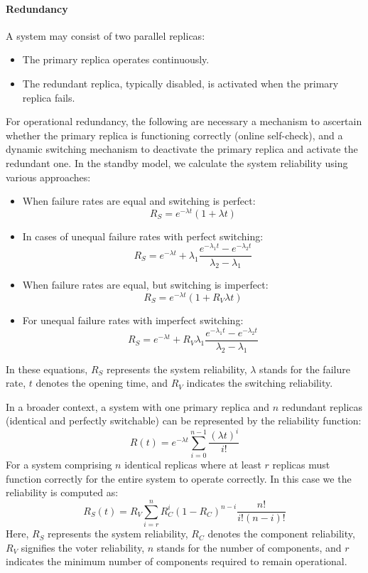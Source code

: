 \paragraph*{Redundancy}
A system may consist of two parallel replicas:
\begin{itemize}
    \item The primary replica operates continuously.
    \item The redundant replica, typically disabled, is activated when the primary replica fails.
\end{itemize}
For operational redundancy, the following are necessary a mechanism to ascertain whether the primary replica is functioning correctly (online self-check), and a dynamic switching mechanism to deactivate the primary replica and activate the redundant one.
In the standby model, we calculate the system reliability using various approaches:
\begin{itemize}
    \item When failure rates are equal and switching is perfect:
        \[R_S=e^{-\lambda t}(1+\lambda t)\]
    \item In cases of unequal failure rates with perfect switching:
        \[R_S=e^{-\lambda t}+\lambda_1 \dfrac{e^{-\lambda_1 t}-e^{-\lambda_2 t}}{\lambda_2-\lambda_1}\]
    \item When failure rates are equal, but switching is imperfect:
        \[R_S=e^{-\lambda t}(1+R_V\lambda t)\]
    \item For unequal failure rates with imperfect switching:
        \[R_S=e^{-\lambda t}+R_V\lambda_1 \dfrac{e^{-\lambda_1 t}-e^{-\lambda_2 t}}{\lambda_2-\lambda_1}\]
\end{itemize}
In these equations, $R_S$ represents the system reliability, $\lambda$ stands for the failure rate, $t$ denotes the opening time, and $R_V$ indicates the switching reliability.

In a broader context, a system with one primary replica and $n$ redundant replicas (identical and perfectly switchable) can be represented by the reliability function:
\[R(t)=e^{-\lambda t}\sum_{i=0}^{n-1}\dfrac{{\left(\lambda t\right)}^i}{i!}\]
For a system comprising $n$ identical replicas where at least $r$ replicas must function correctly for the entire system to operate correctly. 
In this case we the reliability is computed as: 
\[R_S(t)=R_V\sum_{i=r}^{n}R_C^i{(1-R_C)}^{n-i}\dfrac{n!}{i!(n-i)!}\]
Here, $R_S$ represents the system reliability, $R_C$ denotes the component reliability, $R_V$ signifies the voter reliability, $n$ stands for the number of components, and $r$ indicates the minimum number of components required to remain operational.

